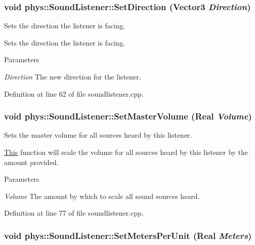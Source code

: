 \hypertarget{classphys_1_1SoundListener_ad4ba93b650897e355c26b09e3f95bce0}{
\subsubsection[{SetDirection}]{\setlength{\rightskip}{0pt plus 5cm}void phys::SoundListener::SetDirection ({\bf Vector3} {\em Direction})}}
\label{d1/d5a/classphys_1_1SoundListener_ad4ba93b650897e355c26b09e3f95bce0}


Sets the direction the listener is facing. 

Sets the direction the listener is facing. 
\begin{DoxyParams}{Parameters}
\item[{\em Direction}]The new direction for the listener. \end{DoxyParams}


Definition at line 62 of file soundlistener.cpp.

\hypertarget{classphys_1_1SoundListener_a8375218557d4a79889bc59da6b064a43}{
\subsubsection[{SetMasterVolume}]{\setlength{\rightskip}{0pt plus 5cm}void phys::SoundListener::SetMasterVolume ({\bf Real} {\em Volume})}}
\label{d1/d5a/classphys_1_1SoundListener_a8375218557d4a79889bc59da6b064a43}


Sets the master volume for all sources heard by this listener. 

\hyperlink{structThis}{This} function will scale the volume for all sources heard by this listener by the amount provided. 
\begin{DoxyParams}{Parameters}
\item[{\em Volume}]The amount by which to scale all sound sources heard. \end{DoxyParams}


Definition at line 77 of file soundlistener.cpp.

\hypertarget{classphys_1_1SoundListener_ae5d432f4e1bf7eb788364e7ea0c4e0a6}{
\subsubsection[{SetMetersPerUnit}]{\setlength{\rightskip}{0pt plus 5cm}void phys::SoundListener::SetMetersPerUnit ({\bf Real} {\em Meters})}}
\label{d1/d5a/classphys_1_1SoundListener_ae5d432f4e1bf7eb788364e7ea0c4e0a6}


